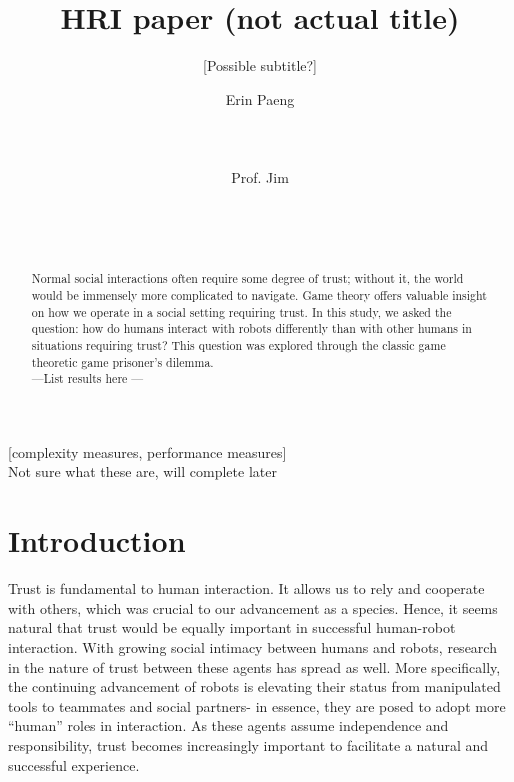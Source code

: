 \documentclass{sig-alternate}
\begin{document}
\title{HRI paper (not actual title)}
\subtitle{[Possible subtitle?]}

\author{
\alignauthor
Erin Paeng\\
       \\
       \\
       \\
\alignauthor
Prof. Jim\\
       \\
       \\
       \\
       }

\maketitle
\begin{abstract}
Normal social interactions often require some degree of trust; without it, the world would be immensely more complicated to navigate. Game theory offers valuable insight on how we operate in a social setting requiring trust. In this study, we asked the question: how do humans interact with robots differently than with other humans in situations requiring trust? This question was explored through the classic game theoretic game prisoner's dilemma.\\ ---List results here ---
\end{abstract}

[complexity measures, performance measures]
\\Not sure what these are, will complete later



\section{Introduction}
Trust is fundamental to human interaction. It allows us to rely and cooperate with others, which was crucial to our advancement as a species. Hence, it seems natural that trust would be equally important in successful human-robot interaction. With growing social intimacy between humans and robots, research in the nature of trust between these agents has spread as well. More specifically, the continuing advancement of robots is elevating their status from manipulated tools to teammates and social partners- in essence, they are posed to adopt more ``human'' roles in interaction. As these agents assume independence and responsibility, trust becomes increasingly important to facilitate a natural and successful experience.
\end{document}
